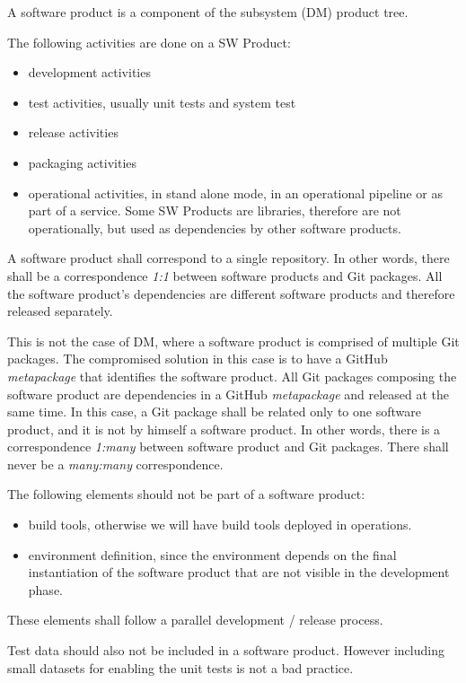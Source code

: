 A software product is a component of the subsystem (\gls{DM}) product tree.

The following activities are done on a \gls{SW} Product:
\begin{itemize}
\item development activities
\item test activities, usually unit tests and system test
\item release activities
\item packaging activities
\item operational activities, in stand alone mode, in an operational pipeline or as part of a service. Some \gls{SW} Products are libraries, therefore are not operationally, but used as dependencies by other software products.
\end{itemize}

A software product shall correspond to a single repository.
In other  words, there shall be a correspondence \textit{1:1} between software products and Git packages.
All the software product's dependencies are different software products and therefore released separately.

This is not the case of \gls{DM}, where a software product is comprised of multiple Git packages.
The compromised solution in this case is to have a GitHub \textit{metapackage} that identifies the software product.
All Git packages composing the software product are dependencies in a GitHub \textit{metapackage} and released at the same time.
In this case, a Git package shall be related only to one software product, and it is not by himself a software product.
In other words, there is a correspondence \textit{1:many} between software product and Git packages.
There shall never be a \textit{many:many} correspondence.

The following elements should not be part of a software product:

\begin{itemize}
\item build tools, otherwise we will have build tools deployed in operations.
\item environment definition, since the environment depends on the final instantiation of the software product that are not visible in the development phase.
\end{itemize}

These elements shall follow a parallel development / release process.

Test data should also not be included in a software product. However including small datasets for enabling the unit tests is not a bad practice.

